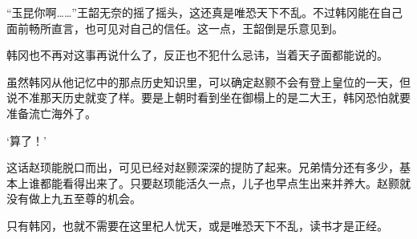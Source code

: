 “玉昆你啊……”王韶无奈的摇了摇头，这还真是唯恐天下不乱。不过韩冈能在自己面前畅所直言，也可见对自己的信任。这一点，王韶倒是乐意见到。

韩冈也不再对这事再说什么了，反正也不犯什么忌讳，当着天子面都能说的。

虽然韩冈从他记忆中的那点历史知识里，可以确定赵颢不会有登上皇位的一天，但说不准那天历史就变了样。要是上朝时看到坐在御榻上的是二大王，韩冈恐怕就要准备流亡海外了。

‘算了！’

这话赵顼能脱口而出，可见已经对赵颢深深的提防了起来。兄弟情分还有多少，基本上谁都能看得出来了。只要赵顼能活久一点，儿子也早点生出来并养大。赵颢就没有做上九五至尊的机会。

只有韩冈，也就不需要在这里杞人忧天，或是唯恐天下不乱，读书才是正经。

